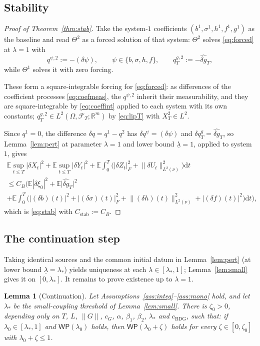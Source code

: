 \documentclass[preprint,12pt]{elsarticle}
\newcommand{\R}{\mathbb{R}}
\newcommand{\E}{\mathbb{E}}
\newcommand{\F}{\mathcal{F}}
\newcommand{\diff}{\mathrm{d}}
\newcommand{\Lnu}{L^2(\nu)}
\newcommand{\Lnorm}[1]{\lVert #1\rVert_{\Lnu}}
\numberwithin{equation}{section}
\theoremstyle{plain}
\newtheorem{lemma}[theorem]{Lemma}
\theoremstyle{definition}
\theoremstyle{\PaperRemarkStyle}
\begin{document}
\subsection{Stability}\label{sub:stabuniq}

\begin{proof}[Proof of Theorem~\ref{thm:stab}]
Take the system-$1$ coefficients $(b^1,\sigma^1,h^1,f^1,g^1)$ as the baseline and read
$\Theta^2$ as a forced solution of that system: $\Theta^2$ solves \eqref{eq:forced} at
$\lambda=1$ with
\[
q^{\psi,2}:=-(\delta\psi),\qquad \psi\in\{b,\sigma,h,f\},\qquad
q^{g,2}_T:=-\widehat{\delta g}_T ,
\]
while $\Theta^1$ solves it with zero forcing.

These form a square-integrable forcing for \eqref{eq:forced}: as differences of the
coefficient processes \eqref{eq:coefmeas}, the $q^{\psi,2}$ inherit their measurability,
and they are square-integrable by \eqref{eq:coeffint} applied to each system with its own
constants; $q^{g,2}_T\in L^2(\Omega,\F_T;\R^m)$ by \eqref{eq:lipT} with $X^2_T\in L^2$.

Since $q^1=0$, the difference $\delta q=q^1-q^2$ has $\delta q^\psi=(\delta\psi)$ and
$\delta q^g_T=\widehat{\delta g}_T$, so Lemma~\ref{lem:pert} at parameter $\lambda=1$ and
lower bound $\underline\lambda=1$, applied to
system~$1$, gives
\begin{multline*}
\E\sup_{t\le T}|\delta X_t|^2+\E\sup_{t\le T}|\delta Y_t|^2
+\E\!\int_0^T\!\big(|\delta Z_t|_F^2+\Lnorm{\delta U_t}^2\big)\diff t\\
\le C_B\Big(\E|\delta\xi_0|^2+\E\big|\widehat{\delta g}_T\big|^2\\
+\E\!\int_0^T\!\big(|(\delta b)(t)|^2+|(\delta\sigma)(t)|_F^2
+\Lnorm{(\delta h)(t)}^2+|(\delta f)(t)|^2\big)\diff t\Big),
\end{multline*}
which is \eqref{eq:stab} with $C_{\mathrm{stab}}:=C_B$.
\end{proof}

\subsection{The continuation step}

Taking identical sources and the common initial datum in Lemma~\ref{lem:pert} (at
lower bound $\underline\lambda=\lambda_*$) yields
uniqueness at each $\lambda\in[\lambda_*,1]$; Lemma~\ref{lem:small} gives it on
$[0,\lambda_*]$. It remains to prove existence up to $\lambda=1$.

\begin{lemma}[Continuation]\label{lem:cont}
Let Assumptions~\ref{ass:integ}--\ref{ass:mono} hold, and let $\lambda_*$ be the
small-coupling threshold of Lemma~\ref{lem:small}. There is $\zeta_0>0$, depending only on
$T$, $L$, $\|G\|$, $c_G$, $\alpha$, $\beta_1$, $\beta_2$, $\lambda_*$ and $c_{\mathrm{BDG}}$, such that: if
$\lambda_0\in[\lambda_*,1]$ and $\mathsf{WP}(\lambda_0)$ holds, then
$\mathsf{WP}(\lambda_0+\zeta)$ holds for every $\zeta\in[0,\zeta_0]$ with $\lambda_0+\zeta\le1$.
\end{lemma}
\end{document}

